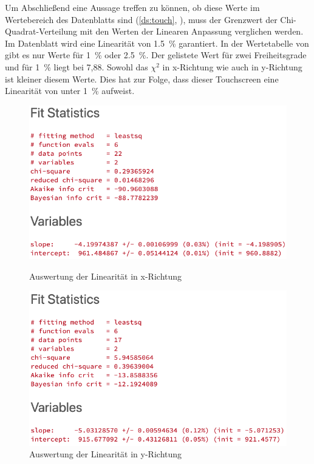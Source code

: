 Um Abschließend eine Aussage treffen zu können, ob diese Werte im Wertebereich des Datenblatts sind (\cref{ds:touch}, ), muss der Grenzwert der Chi-Quadrat-Verteilung mit den Werten der Linearen Anpassung verglichen werden.
Im Datenblatt wird eine Linearität von \SI{1,5}{\%} garantiert.
In der Wertetabelle von \cite{papula} gibt es nur Werte für \SI{1}{\%} oder \SI{2,5}{\%}.
Der gelistete Wert für zwei Freiheitsgrade und für \SI{1}{\%} liegt bei 7,88.
Sowohl das \(\chi^2\) in x-Richtung wie auch in y-Richtung ist kleiner diesem Werte.
Dies hat zur Folge, dass dieser Touchscreen eine Linearität von unter \SI{1}{\%} aufweist.
\begin{figure}
    \begin{minipage}{0.49\linewidth}
        \centering
        \includegraphics[width=\linewidth]{fig/raster/xfit.png}
        \caption{Auswertung der Linearität in x-Richtung}
        \label{fig:xfit}
    \end{minipage}
    \begin{minipage}{0.49\linewidth}
        \centering
        \includegraphics[width=\linewidth]{fig/raster/yfit.png}
        \caption{Auswertung der Linearität in y-Richtung}
        \label{fig:yfit}
    \end{minipage}
\end{figure} 
